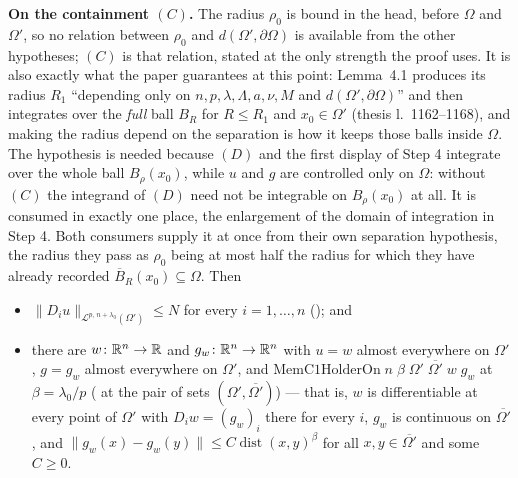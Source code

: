 \begin{lemma}
\medskip
\noindent\textbf{On the containment $(C)$.}  The radius $\rho_0$ is bound in the
head, before $\Omega$ and $\Omega'$, so no relation between $\rho_0$ and
$d(\Omega',\partial\Omega)$ is available from the other hypotheses; $(C)$ is
that relation, stated at the only strength the proof uses.  It is also exactly
what the paper guarantees at this point: Lemma~4.1 produces its radius $R_1$
``depending only on $n,p,\lambda,\Lambda,a,\nu,M$ and
$d(\Omega',\partial\Omega)$'' and then integrates over the \emph{full} ball
$B_R$ for $R\le R_1$ and $x_0\in\Omega'$ (thesis l.~1162--1168), and making the
radius depend on the separation is how it keeps those balls inside $\Omega$.
The hypothesis is needed because $(D)$ and the first display of Step 4 integrate
over the whole ball $B_\rho(x_0)$, while $u$ and $g$ are controlled only on
$\Omega$: without $(C)$ the integrand of $(D)$ need not be integrable on
$B_\rho(x_0)$ at all.  It is consumed in exactly one place, the enlargement of
the domain of integration in Step 4.  Both consumers supply it at once from
their own separation hypothesis, the radius they pass as $\rho_0$ being at most
half the radius for which they have already recorded
$\overline B_R(x_0)\subseteq\Omega$.  Then
\begin{itemize}
\item[(i)] $\|D_iu\|_{\mathcal L^{p,\,n+\lambda_0}(\Omega')}\le N$ for every
  $i=1,\dots,n$ (); and
\item[(ii)] there are $w\colon\mathbb{R}^n\to\mathbb{R}$ and $g_w\colon\mathbb{R}^n\to\mathbb{R}^n$ with $u=w$
  almost everywhere on $\Omega'$, $g=g_w$ almost everywhere on $\Omega'$, and
  $\mathrm{MemC1HolderOn}\;n\;\beta\;\Omega'\;\overline{\Omega'}\;w\;g_w$ at
  $\beta=\lambda_0/p$ ( at the pair of sets
  $(\Omega',\overline{\Omega'})$) --- that is, $w$ is differentiable at every
  point of $\Omega'$ with $D_iw=(g_w)_i$ there for every $i$, $g_w$ is
  continuous on $\overline{\Omega'}$, and
  $\|g_w(x)-g_w(y)\|\le C\operatorname{dist}(x,y)^{\beta}$ for all
  $x,y\in\overline{\Omega'}$ and some $C\ge0$.
\end{itemize}
\end{lemma}
